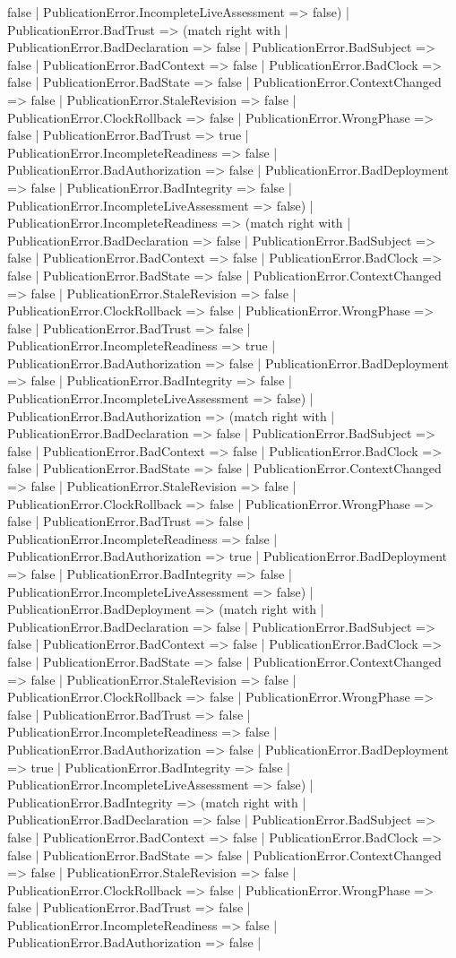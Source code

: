 \documentclass[11pt]{article}
\begin{document}
false | PublicationError.IncompleteLiveAssessment => false) | PublicationError.BadTrust => (match right with | PublicationError.BadDeclaration => false | PublicationError.BadSubject => false | PublicationError.BadContext => false | PublicationError.BadClock => false | PublicationError.BadState => false | PublicationError.ContextChanged => false | PublicationError.StaleRevision => false | PublicationError.ClockRollback => false | PublicationError.WrongPhase => false | PublicationError.BadTrust => true | PublicationError.IncompleteReadiness => false | PublicationError.BadAuthorization => false | PublicationError.BadDeployment => false | PublicationError.BadIntegrity => false | PublicationError.IncompleteLiveAssessment => false) | PublicationError.IncompleteReadiness => (match right with | PublicationError.BadDeclaration => false | PublicationError.BadSubject => false | PublicationError.BadContext => false | PublicationError.BadClock => false | PublicationError.BadState => false | PublicationError.ContextChanged => false | PublicationError.StaleRevision => false | PublicationError.ClockRollback => false | PublicationError.WrongPhase => false | PublicationError.BadTrust => false | PublicationError.IncompleteReadiness => true | PublicationError.BadAuthorization => false | PublicationError.BadDeployment => false | PublicationError.BadIntegrity => false | PublicationError.IncompleteLiveAssessment => false) | PublicationError.BadAuthorization => (match right with | PublicationError.BadDeclaration => false | PublicationError.BadSubject => false | PublicationError.BadContext => false | PublicationError.BadClock => false | PublicationError.BadState => false | PublicationError.ContextChanged => false | PublicationError.StaleRevision => false | PublicationError.ClockRollback => false | PublicationError.WrongPhase => false | PublicationError.BadTrust => false | PublicationError.IncompleteReadiness => false | PublicationError.BadAuthorization => true | PublicationError.BadDeployment => false | PublicationError.BadIntegrity => false | PublicationError.IncompleteLiveAssessment => false) | PublicationError.BadDeployment => (match right with | PublicationError.BadDeclaration => false | PublicationError.BadSubject => false | PublicationError.BadContext => false | PublicationError.BadClock => false | PublicationError.BadState => false | PublicationError.ContextChanged => false | PublicationError.StaleRevision => false | PublicationError.ClockRollback => false | PublicationError.WrongPhase => false | PublicationError.BadTrust => false | PublicationError.IncompleteReadiness => false | PublicationError.BadAuthorization => false | PublicationError.BadDeployment => true | PublicationError.BadIntegrity => false | PublicationError.IncompleteLiveAssessment => false) | PublicationError.BadIntegrity => (match right with | PublicationError.BadDeclaration => false | PublicationError.BadSubject => false | PublicationError.BadContext => false | PublicationError.BadClock => false | PublicationError.BadState => false | PublicationError.ContextChanged => false | PublicationError.StaleRevision => false | PublicationError.ClockRollback => false | PublicationError.WrongPhase => false | PublicationError.BadTrust => false | PublicationError.IncompleteReadiness => false | PublicationError.BadAuthorization => false | 
\end{document}
